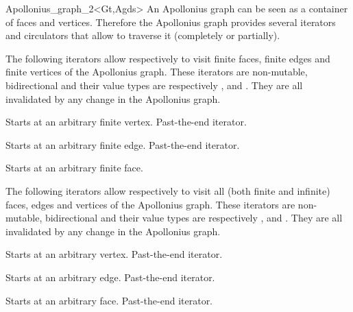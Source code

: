 \begin{ccRefClass}{Apollonius_graph_2<Gt,Agds>}
An Apollonius graph can be seen as a container of faces and vertices.
Therefore the Apollonius graph provides several iterators and circulators
that allow to traverse it (completely or partially).





The following iterators allow respectively to visit 
finite faces,  finite edges and  finite vertices
of the Apollonius graph. These iterators are non-mutable,
bidirectional and their value types are respectively
,  and . 
They are all invalidated by any change in the Apollonius graph.

{Starts at an arbitrary finite vertex.}
\ccGlue
{}
{Past-the-end iterator.}

{Starts at an arbitrary finite edge.}
\ccGlue
{}
{Past-the-end iterator.}

{Starts at an arbitrary finite face.}
\ccGlue
{}

The following iterators allow respectively to visit all
(both finite and infinite) faces, edges and vertices
of the Apollonius graph. These iterators are non-mutable, bidirectional
and their value types are respectively
,  and . 
They are all invalidated by any change in the Apollonius graph.


{Starts at an arbitrary  vertex.}
\ccGlue
{}
{Past-the-end iterator.}

{Starts at an arbitrary edge.}
\ccGlue
{}
{Past-the-end iterator.}

{Starts at an arbitrary face.}
\ccGlue
{}
{Past-the-end iterator.}





\end{ccRefClass}
